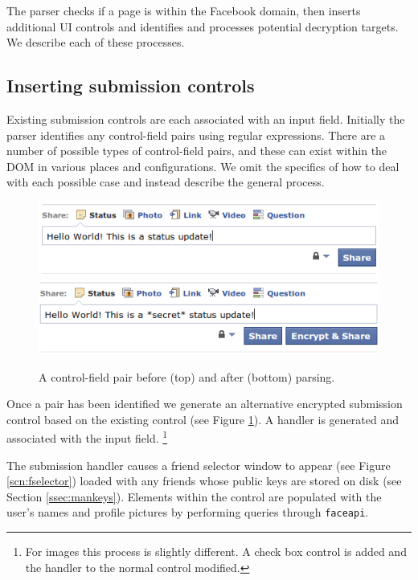 The parser checks if a page is within the Facebook domain, then inserts additional UI controls and identifies and processes potential decryption targets. We describe each of these processes.

\subsection{Inserting submission controls}
\label{ssec:insert}

Existing submission controls are each associated with an input field. Initially the parser identifies any control-field pairs using regular expressions. There are a number of possible types of control-field pairs, and these can exist within the DOM in various places and configurations. We omit the specifics of how to deal with each possible case and instead describe the general process.

    \begin{figure}[tb]
        \begin{center}
                \includegraphics[width=12cm]{screens/control1.png}
                \includegraphics[width=12cm]{screens/control2.png}
            \caption{A control-field pair before (top) and after (bottom) parsing.}
            \label{scn:ctrl}
        \end{center}
    \end{figure}

Once a pair has been identified we generate an alternative encrypted submission control based on the existing control (see Figure \ref{scn:ctrl}). A handler is generated and associated with the input field. \footnote{For images this process is slightly different. A check box control is added and the handler to the normal control modified.}

The submission handler causes a friend selector window to appear (see Figure \ref{scn:fselector}) loaded with any friends whose public keys are stored on disk (see Section \ref{ssec:mankeys}). Elements within the control are populated with the user's names and profile pictures by performing queries through {\tt faceapi}.

